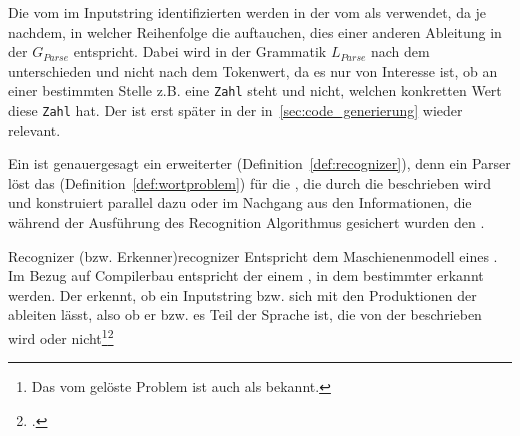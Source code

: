 Die vom  im Inputstring identifizierten  werden in der  vom  als  verwendet, da je nachdem, in welcher Reihenfolge die  auftauchen, dies einer anderen Ableitung in der  $G_{Parse}$ entspricht. Dabei wird in der Grammatik $L_{Parse}$ nach dem  unterschieden und nicht nach dem Tokenwert, da es nur von Interesse ist, ob an einer bestimmten Stelle z.B. eine \verb|Zahl| steht und nicht, welchen konkretten Wert diese \verb|Zahl| hat. Der  ist erst später in der  in~\ref{sec:code_generierung} wieder relevant.

Ein  ist genauergesagt ein erweiterter  (Definition~\ref{def:recognizer}), denn ein Parser löst das  (Definition~\ref{def:wortproblem}) für die , die durch die  beschrieben wird und konstruiert parallel dazu oder im Nachgang aus den Informationen, die während der Ausführung des Recognition Algorithmus gesichert wurden den .

\begin{Definition}{Recognizer (bzw. Erkenner)}{recognizer}
  Entspricht dem Maschienenmodell eines . Im Bezug auf Compilerbau entspricht der  einem , in dem  bestimmter  erkannt werden. Der  erkennt, ob ein Inputstring bzw.  sich mit den Produktionen der  ableiten lässt, also ob er bzw. es Teil der Sprache ist, die von der  beschrieben wird oder nicht\footnote{Das vom  gelöste Problem ist auch als  bekannt.}\footcite{thiemann_compilerbau_2021}
\end{Definition}

